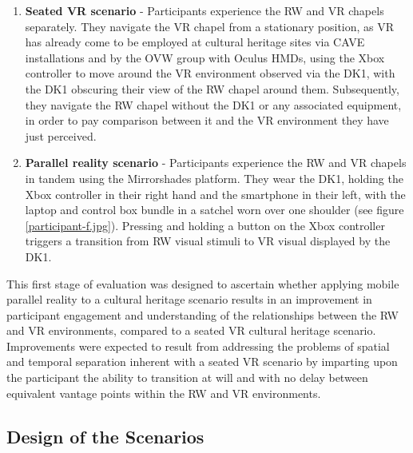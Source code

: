 \begin{enumerate}
	\item \textbf{Seated VR scenario} - Participants experience the RW and VR chapels separately. They navigate the VR chapel from a stationary position, as VR has already come to be employed at cultural heritage sites via CAVE installations and by the OVW group with Oculus HMDs, using the Xbox controller to move around the VR environment observed via the DK1, with the DK1 obscuring their view of the RW chapel around them. Subsequently, they navigate the RW chapel without the DK1 or any associated equipment, in order to pay comparison between it and the VR environment they have just perceived.
	\item \textbf{Parallel reality scenario} - Participants experience the RW and VR chapels in tandem using the Mirrorshades platform. They wear the DK1, holding the Xbox controller in their right hand and the smartphone in their left, with the laptop and control box bundle in a satchel worn over one shoulder (see figure \ref{participant-f.jpg}). Pressing and holding a button on the Xbox controller triggers a transition from RW visual stimuli to VR visual displayed by the DK1.
\end{enumerate}

This first stage of evaluation was designed to ascertain whether applying mobile parallel reality to a cultural heritage scenario results in an improvement in participant engagement and understanding of the relationships between the RW and VR environments, compared to a seated VR cultural heritage scenario. Improvements were expected to result from addressing the problems of spatial and temporal separation inherent with a seated VR scenario by imparting upon the participant the ability to transition at will and with no delay between equivalent vantage points within the RW and VR environments.


\subsection{Design of the Scenarios}

